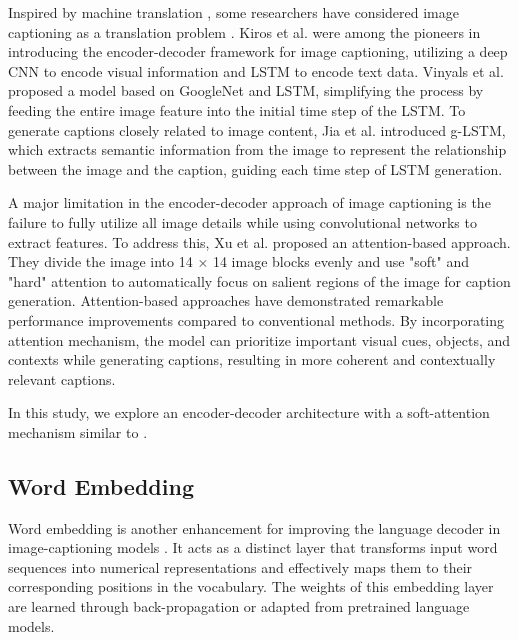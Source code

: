 \documentclass[conference]{IEEEtran}
\begin{document}
Inspired by machine translation \cite{sutskever2014sequence}, some researchers have considered image captioning as a translation problem \cite{donahue2015long}. Kiros et al. \cite{kiros2014unifying} were among the pioneers in introducing the encoder-decoder framework for image captioning, utilizing a deep CNN to encode visual information and LSTM to encode text data. Vinyals et al. \cite{vinyals2015show} proposed a model based on GoogleNet \cite{szegedy2015going} and LSTM, simplifying the process by feeding the entire image feature into the initial time step of the LSTM. To generate captions closely related to image content, Jia et al. \cite{jia2015guiding} introduced g-LSTM, which extracts semantic information from the image to represent the relationship between the image and the caption, guiding each time step of LSTM generation.


A major limitation in the encoder-decoder approach of image captioning is the failure to fully utilize all image details while using convolutional networks to extract features. To address this, Xu et al. \cite{xu2015show} proposed an attention-based approach. They divide the image into 14 × 14 image blocks evenly and use "soft" and "hard" attention to automatically focus on salient regions of the image for caption generation. Attention-based approaches have demonstrated remarkable performance improvements compared to conventional methods. By incorporating attention mechanism, the model can prioritize important visual cues, objects, and contexts while generating captions, resulting in more coherent and contextually relevant captions.


In this study, we explore an encoder-decoder architecture with a soft-attention mechanism similar to \cite{xu2015show}.


\subsection{Word Embedding}
Word embedding is another enhancement for improving the language decoder in image-captioning models \cite{elbedwehy2023enhanced}. It acts as a distinct layer that transforms input word sequences into numerical representations and effectively maps them to their corresponding positions in the vocabulary. The weights of this embedding layer are learned through back-propagation or adapted from pretrained language models.
\end{document}
